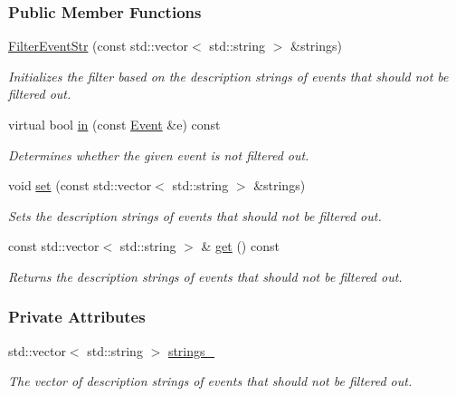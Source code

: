 \subsubsection*{Public Member Functions}
\begin{DoxyCompactItemize}
\item 
\hyperlink{structslb_1_1core_1_1ui_1_1FilterEventStr_ae3526ea4668a1ff0539eb94802b99a79}{Filter\+Event\+Str} (const std\+::vector$<$ std\+::string $>$ \&strings)
\begin{DoxyCompactList}\small\item\em Initializes the filter based on the description strings of events that should not be filtered out. \end{DoxyCompactList}\item 
virtual bool \hyperlink{structslb_1_1core_1_1ui_1_1FilterEventStr_a293ba80691a7b507e8ad765e26da20a1}{in} (const \hyperlink{structslb_1_1core_1_1ui_1_1FilterBase_a4cf70d819855984dc0e15a036e8b8a14}{Event} \&e) const 
\begin{DoxyCompactList}\small\item\em Determines whether the given event is not filtered out. \end{DoxyCompactList}\item 
void \hyperlink{structslb_1_1core_1_1ui_1_1FilterEventStr_accd872f69c9e216911b28b86e5750d79}{set} (const std\+::vector$<$ std\+::string $>$ \&strings)
\begin{DoxyCompactList}\small\item\em Sets the description strings of events that should not be filtered out. \end{DoxyCompactList}\item 
const std\+::vector$<$ std\+::string $>$ \& \hyperlink{structslb_1_1core_1_1ui_1_1FilterEventStr_a4e97c281a9ecbdbba3b427ed8eea76ee}{get} () const 
\begin{DoxyCompactList}\small\item\em Returns the description strings of events that should not be filtered out. \end{DoxyCompactList}\end{DoxyCompactItemize}
\subsubsection*{Private Attributes}
\begin{DoxyCompactItemize}
\item 
std\+::vector$<$ std\+::string $>$ \hyperlink{structslb_1_1core_1_1ui_1_1FilterEventStr_a0dc4d01a3e30f573f842a1766d559d33}{strings\+\_\+}\hypertarget{structslb_1_1core_1_1ui_1_1FilterEventStr_a0dc4d01a3e30f573f842a1766d559d33}{}\label{structslb_1_1core_1_1ui_1_1FilterEventStr_a0dc4d01a3e30f573f842a1766d559d33}

\begin{DoxyCompactList}\small\item\em The vector of description strings of events that should not be filtered out. \end{DoxyCompactList}\end{DoxyCompactItemize}


